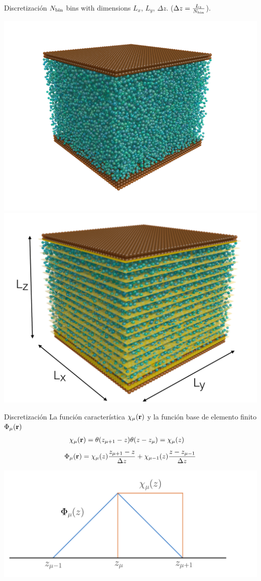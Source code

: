 \documentclass{beamer}
\begin{document}
\begin{frame}{Discretización}
  $N_{\rm bin}$ bins with dimensions $L_x$, $L_y$, $\Delta z$. ($\Delta z = \frac{L_z}{N_{\rm bin}}$). 
      \begin{center}
        \includegraphics[width=.5\linewidth]{PRL3_gold2_wo_layers_wo_diffuse}
        \includegraphics[width=.45\linewidth]{scheme-bines}
      \end{center}
  \end{frame}
\begin{frame}{Discretización}
  La función característica $\chi_{\mu}({\bf r})$ y la función base de elemento finito $\Phi_{\mu}({\bf r})$
    \begin{align}
    \chi_\mu({\bf r})&=\theta(z_{\mu+ 1}-z)\theta(z-z_\mu)=\chi_\mu(z)
    \nonumber
    \end{align}
    \begin{align}
      \Phi_\mu({\bf r})=\chi_\mu(z)\frac{z_{\mu+1}-z}{\Delta z}+\chi_{\mu-1}(z)\frac{z-z_{\mu-1}}{\Delta z}
      \nonumber
    \end{align}
    \begin{center} 
      \includegraphics[width = \linewidth]{psichi}
    \end{center}
\end{frame}
\end{document}
